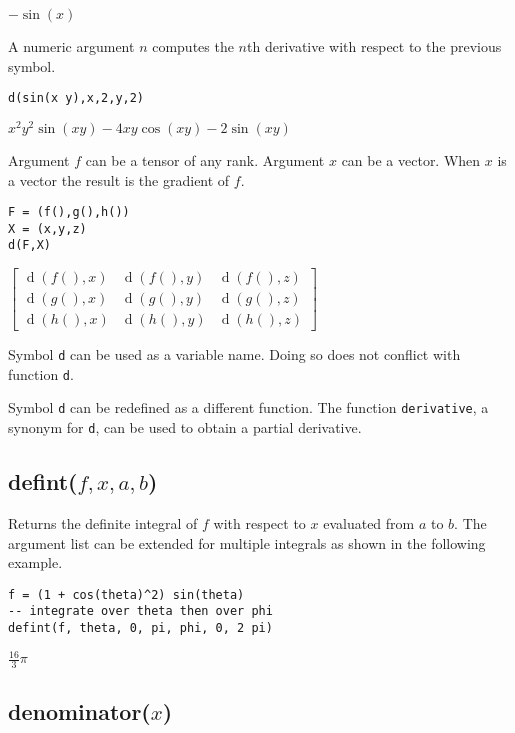 \documentclass[12pt]{article}
\begin{document}
\noindent
$-\sin(x)$

\bigskip
\noindent
A numeric argument $n$ computes the $n$th derivative with respect to the previous symbol.

{\color{blue}
\begin{verbatim}
d(sin(x y),x,2,y,2)
\end{verbatim}
}

\noindent
$x^2y^2\sin(xy)-4xy\cos(xy)-2\sin(xy)$

\bigskip
\noindent
Argument $f$ can be a tensor of any rank.
Argument $x$ can be a vector.
When $x$ is a vector the result is the gradient of $f$.

{\color{blue}
\begin{verbatim}
F = (f(),g(),h())
X = (x,y,z)
d(F,X)
\end{verbatim}
}

\noindent
$\displaystyle
\begin{bmatrix}
\operatorname{d}(f(),x) & \operatorname{d}(f(),y) &  \operatorname{d}(f(),z)
\\[1ex]
\operatorname{d}(g(),x) & \operatorname{d}(g(),y) &  \operatorname{d}(g(),z)
\\[1ex]
\operatorname{d}(h(),x) & \operatorname{d}(h(),y) &  \operatorname{d}(h(),z)
\end{bmatrix}
$

\bigskip
\noindent
Symbol \verb$d$ can be used as a variable name.
Doing so does not conflict with function \verb$d$.

\bigskip
\noindent
Symbol \verb$d$ can be redefined as a different function.
The function \verb$derivative$, a synonym for \verb$d$, can be used to obtain a partial derivative.

\subsection*{defint($f,x,a,b$)}

Returns the definite integral of $f$ with respect to $x$
evaluated from $a$ to $b$.
The argument list can be extended for multiple integrals
as shown in the following example.

{\color{blue}
\begin{verbatim}
f = (1 + cos(theta)^2) sin(theta)
-- integrate over theta then over phi
defint(f, theta, 0, pi, phi, 0, 2 pi)
\end{verbatim}
}

\noindent
$\tfrac{16}{3}\pi$

\subsection*{denominator($x$)}
\end{document}
